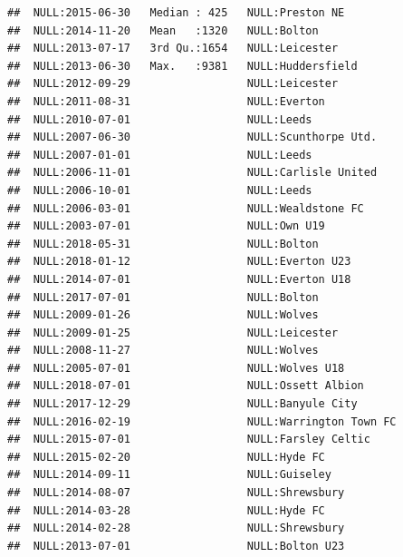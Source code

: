 \documentclass{article}\usepackage[]{graphicx}\usepackage[]{color}
\makeatletter
\newenvironment{kframe}{%
 \def\at@end@of@kframe{}%
 \ifinner\ifhmode%
  \def\at@end@of@kframe{\end{minipage}}%
  \begin{minipage}{\columnwidth}%
 \fi\fi%
 \def\FrameCommand##1{\hskip\@totalleftmargin \hskip-\fboxsep
 \colorbox{shadecolor}{##1}\hskip-\fboxsep
     \hskip-\linewidth \hskip-\@totalleftmargin \hskip\columnwidth}%
 \MakeFramed {\advance\hsize-\width
   \@totalleftmargin\z@ \linewidth\hsize
   \@setminipage}}%
 {\par\unskip\endMakeFramed%
 \at@end@of@kframe}
\newenvironment{knitrout}{}{} %
\makeatother
\begin{document}
\begin{knitrout}
\begin{kframe}
\begin{verbatim}
##  NULL:2015-06-30   Median : 425   NULL:Preston NE                                
##  NULL:2014-11-20   Mean   :1320   NULL:Bolton                                    
##  NULL:2013-07-17   3rd Qu.:1654   NULL:Leicester                                 
##  NULL:2013-06-30   Max.   :9381   NULL:Huddersfield                              
##  NULL:2012-09-29                  NULL:Leicester                                 
##  NULL:2011-08-31                  NULL:Everton                                   
##  NULL:2010-07-01                  NULL:Leeds                                     
##  NULL:2007-06-30                  NULL:Scunthorpe Utd.                           
##  NULL:2007-01-01                  NULL:Leeds                                     
##  NULL:2006-11-01                  NULL:Carlisle United                           
##  NULL:2006-10-01                  NULL:Leeds                                     
##  NULL:2006-03-01                  NULL:Wealdstone FC                             
##  NULL:2003-07-01                  NULL:Own U19                                   
##  NULL:2018-05-31                  NULL:Bolton                                    
##  NULL:2018-01-12                  NULL:Everton U23                               
##  NULL:2014-07-01                  NULL:Everton U18                               
##  NULL:2017-07-01                  NULL:Bolton                                    
##  NULL:2009-01-26                  NULL:Wolves                                    
##  NULL:2009-01-25                  NULL:Leicester                                 
##  NULL:2008-11-27                  NULL:Wolves                                    
##  NULL:2005-07-01                  NULL:Wolves U18                                
##  NULL:2018-07-01                  NULL:Ossett Albion                             
##  NULL:2017-12-29                  NULL:Banyule City                              
##  NULL:2016-02-19                  NULL:Warrington Town FC                        
##  NULL:2015-07-01                  NULL:Farsley Celtic                            
##  NULL:2015-02-20                  NULL:Hyde FC                                   
##  NULL:2014-09-11                  NULL:Guiseley                                  
##  NULL:2014-08-07                  NULL:Shrewsbury                                
##  NULL:2014-03-28                  NULL:Hyde FC                                   
##  NULL:2014-02-28                  NULL:Shrewsbury                                
##  NULL:2013-07-01                  NULL:Bolton U23                                

\end{verbatim}
\end{kframe}
\end{knitrout}
\end{document}
